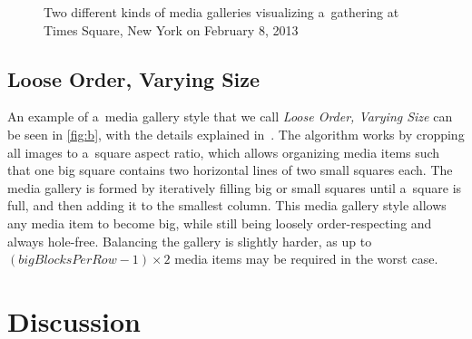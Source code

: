 \documentclass{sig-alternate}
\begin{document}
\begin{figure}[t!]
  \centering
  \caption{Two different kinds of media galleries visualizing a~gathering at Times Square, New York on February 8, 2013}
  \label{fig:media-gallery}  
\end{figure}

\subsection{Loose Order, Varying Size}

An example of a~media gallery style
that we call \emph{Loose Order, Varying Size}
can be seen in \autoref{fig:b},
with the details explained in~\cite{chedeau2012facebook}.
The algorithm works by cropping all images to a~square aspect ratio,
which allows organizing media items such that one big square
contains two horizontal lines of two small squares each.
The media gallery is formed by iteratively filling
big or small squares until a~square is full,
and then adding it to the smallest column.
This media gallery style allows any media item to become big,
while still being loosely order-respecting and always hole-free.
Balancing the gallery is slightly harder,
as up to $ (\mathit{bigBlocksPerRow} - 1) \times 2 $ media items
may be required in the worst case.

\section{Discussion}
\end{document}

